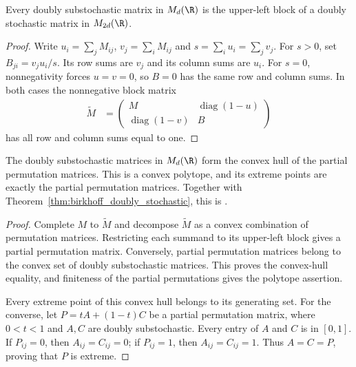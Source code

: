 \begin{theorem}
    \label{thm:doubly_substochastic_completion}
    \leanok
    Every doubly substochastic matrix in $M_d(\R)$ is the upper-left block
    of a doubly stochastic matrix in $M_{2d}(\R)$.
\end{theorem}
\begin{proof}\leanok
    Write $u_i=\sum_jM_{ij}$, $v_j=\sum_iM_{ij}$ and
    $s=\sum_i u_i=\sum_jv_j$. For $s>0$, set $B_{ji}=v_ju_i/s$.
    Its row sums are $v_j$ and its column sums are $u_i$. For $s=0$,
    nonnegativity forces $u=v=0$, so $B=0$ has the same row and column
    sums. In both cases the nonnegative block matrix
    \begin{align}
        \widetilde M
        &=\begin{pmatrix}
            M&\operatorname{diag}(1-u)\\
            \operatorname{diag}(1-v)&B
          \end{pmatrix}
    \end{align}
    has all row and column sums equal to one.
\end{proof}

\begin{theorem}
    \label{thm:birkhoff_doubly_substochastic}
    \leanok
    The doubly substochastic matrices in $M_d(\R)$ form the convex hull
    of the partial permutation matrices. This is a convex polytope, and
    its extreme points are exactly the partial permutation matrices.
    Together with Theorem~\ref{thm:birkhoff_doubly_stochastic}, this is
    \cite[Chapter~8, Theorem~8.6]{Wolf2012Quantum}.
\end{theorem}
\begin{proof}\leanok
    Complete $M$ to $\widetilde M$ and decompose $\widetilde M$ as a convex
    combination of permutation matrices. Restricting each summand to its
    upper-left block gives a partial permutation matrix. Conversely,
    partial permutation matrices belong to the convex set of doubly
    substochastic matrices. This proves the convex-hull equality, and
    finiteness of the partial permutations gives the polytope assertion.

    Every extreme point of this convex hull belongs to its generating
    set. For the converse, let $P=tA+(1-t)C$ be a partial permutation
    matrix, where $0<t<1$ and $A,C$ are doubly substochastic. Every entry
    of $A$ and $C$ is in $[0,1]$. If $P_{ij}=0$, then
    $A_{ij}=C_{ij}=0$; if $P_{ij}=1$, then $A_{ij}=C_{ij}=1$.
    Thus $A=C=P$, proving that $P$ is extreme.
\end{proof}

